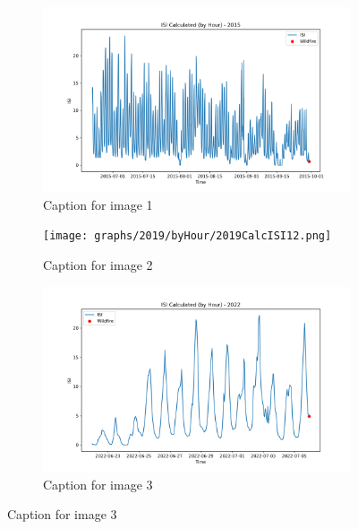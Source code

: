 \begin{figure}[h]
	\centering
	\caption{Caption for the whole figure}
	\begin{subfigure}{0.3\textwidth}
		\centering
		\includegraphics[width=\textwidth]{graphs/2015/byHour/2015CalcISI12.png}
		\caption{Caption for image 1}
		\label{fig:img1}
	\end{subfigure}
	\hfill
	\begin{subfigure}{0.3\textwidth}
		\centering
		\texttt{[image: graphs/2019/byHour/2019CalcISI12.png]}
		\caption{Caption for image 2}
		\label{fig:img2}
	\end{subfigure}
	\hfill
	\begin{subfigure}{0.3\textwidth}
		\centering
		\includegraphics[width=\textwidth]{graphs/2022/2022CalcISI12.png}
		\caption{Caption for image 3}
		\label{fig:img3}
	\end{subfigure}
	
	\label{fig:all_images}
\end{figure}

